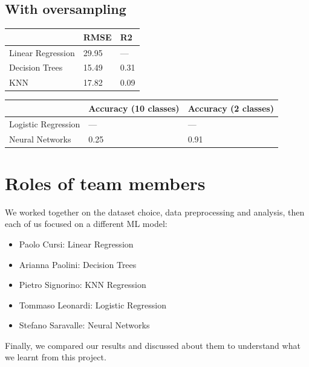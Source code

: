 \documentclass{article}
\begin{document}
\subsection{With oversampling}

\begin{table}[h!]
    \centering
    \begin{tabular}{l|l|l|}
    \cline{2-3}
                                            & RMSE  & R2   \\ \hline
    \multicolumn{1}{|l|}{Linear Regression} & 29.95 & ---  \\ \hline
    \multicolumn{1}{|l|}{Decision Trees}    & 15.49 & 0.31 \\ \hline
    \multicolumn{1}{|l|}{KNN}               & 17.82 & 0.09 \\ \hline
\end{tabular}
\end{table}

\begin{table}[h!]
    \centering
    \begin{tabular}{l|l|l|}
    \cline{2-3}
                                              & Accuracy (10 classes) & Accuracy (2 classes) \\ \hline
    \multicolumn{1}{|l|}{Logistic Regression} & ---                  & ---                 \\ \hline
    \multicolumn{1}{|l|}{Neural Networks}     & 0.25                 & 0.91                \\ \hline
\end{tabular}
\end{table}



\section{Roles of team members}
We worked together on the dataset choice, data preprocessing and analysis, then each of us focused on a different ML model: 
\begin{itemize}
    \item Paolo Cursi: Linear Regression
    \item Arianna Paolini: Decision Trees
    \item Pietro Signorino: KNN Regression
    \item Tommaso Leonardi: Logistic Regression
    \item Stefano Saravalle: Neural Networks
\end{itemize}
Finally, we compared our results and discussed about them to understand what we learnt from this project.



\end{document}

